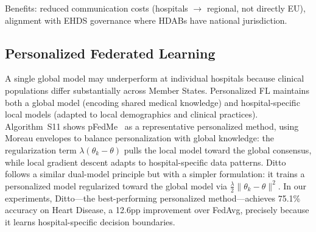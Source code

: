 \documentclass[conference,a4paper]{IEEEtran}
\begin{document}
Benefits: reduced communication costs (hospitals $\to$ regional, not directly EU), alignment with EHDS governance where HDABs have national jurisdiction.

\subsection{Personalized Federated Learning}

A single global model may underperform at individual hospitals because clinical populations differ substantially across Member States. Personalized FL maintains both a global model (encoding shared medical knowledge) and hospital-specific local models (adapted to local demographics and clinical practices). Algorithm~S11 shows pFedMe~\cite{dinh2020pfedme} as a representative personalized method, using Moreau envelopes to balance personalization with global knowledge: the regularization term $\lambda(\theta_k - \theta)$ pulls the local model toward the global consensus, while local gradient descent adapts to hospital-specific data patterns. Ditto~\cite{li2021ditto} follows a similar dual-model principle but with a simpler formulation: it trains a personalized model regularized toward the global model via $\frac{\lambda}{2}\|\theta_k - \theta\|^2$. In our experiments, Ditto---the best-performing personalized method---achieves 75.1\% accuracy on Heart Disease, a 12.6pp improvement over FedAvg, precisely because it learns hospital-specific decision boundaries.

\begin{figure}[htbp]
\centering
{}
\end{figure}
\end{document}
